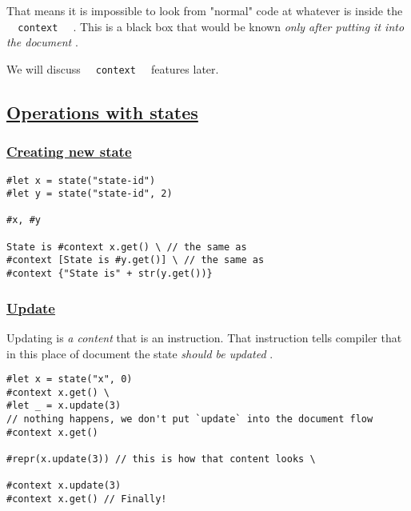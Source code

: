 That means it is impossible to look from "normal" code at whatever is
inside the \texttt{\ }{\texttt{\ context\ }}\texttt{\ } . This is a
black box that would be known \emph{only after putting it into the
document} .

We will discuss \texttt{\ }{\texttt{\ context\ }}\texttt{\ } features
later.

\subsection{\texorpdfstring{\hyperref[operations-with-states]{Operations
with states}}{Operations with states}}\label{operations-with-states}

\subsubsection{\texorpdfstring{\hyperref[creating-new-state]{Creating
new state}}{Creating new state}}\label{creating-new-state}

\begin{verbatim}
#let x = state("state-id")
#let y = state("state-id", 2)

#x, #y

State is #context x.get() \ // the same as
#context [State is #y.get()] \ // the same as
#context {"State is" + str(y.get())}
\end{verbatim}

\pandocbounded{}

\subsubsection{\texorpdfstring{\hyperref[update]{Update}}{Update}}\label{update}

Updating is \emph{a content} that is an instruction. That instruction
tells compiler that in this place of document the state \emph{should be
updated} .

\begin{verbatim}
#let x = state("x", 0)
#context x.get() \
#let _ = x.update(3)
// nothing happens, we don't put `update` into the document flow
#context x.get()

#repr(x.update(3)) // this is how that content looks \

#context x.update(3)
#context x.get() // Finally!
\end{verbatim}

